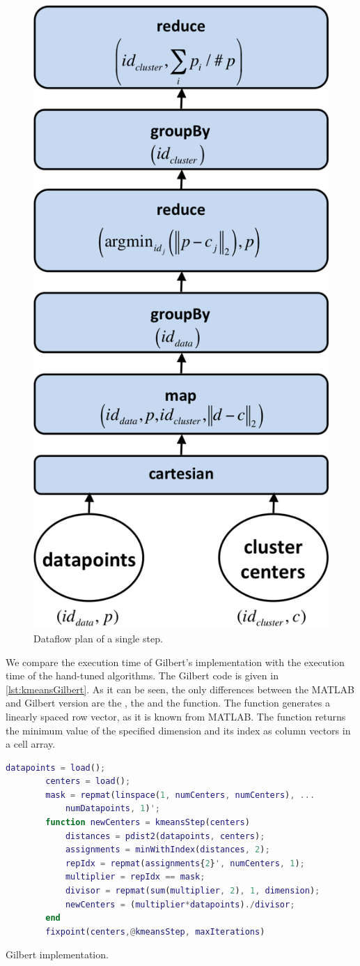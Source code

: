 \begin{figure}
	\centering
	\includegraphics[width=0.3\linewidth]{images/kmeansStep.png}
	\caption{Dataflow plan of a single \kmeans step.}
	\label{fig:kmeansDataflow}
\end{figure}

We compare the execution time of Gilbert's \kmeans implementation with the execution time of the hand-tuned algorithms.
The Gilbert code is given in \cref{lst:kmeansGilbert}.
As it can be seen, the only differences between the MATLAB and Gilbert version are the , the  and the  function.
The  function generates a linearly spaced row vector, as it is known from MATLAB.
The  function returns the minimum value of the specified dimension and its index as column vectors in a cell array.

\begin{listing}
	\begin{CenteredBox}
		\begin{lstlisting}[language=Matlab]
		datapoints = load();
		centers = load();
		mask = repmat(linspace(1, numCenters, numCenters), ...
			numDatapoints, 1)';
		function newCenters = kmeansStep(centers)
  			distances = pdist2(datapoints, centers);
		  	assignments = minWithIndex(distances, 2);
		  	repIdx = repmat(assignments{2}', numCenters, 1);
		  	multiplier = repIdx == mask;
		  	divisor = repmat(sum(multiplier, 2), 1, dimension);
		  	newCenters = (multiplier*datapoints)./divisor;
		end
		fixpoint(centers,@kmeansStep, maxIterations)
		\end{lstlisting}
	\end{CenteredBox}
	\caption{Gilbert \kmeans implementation.}
	\label{lst:kmeansGilbert}
\end{listing}

